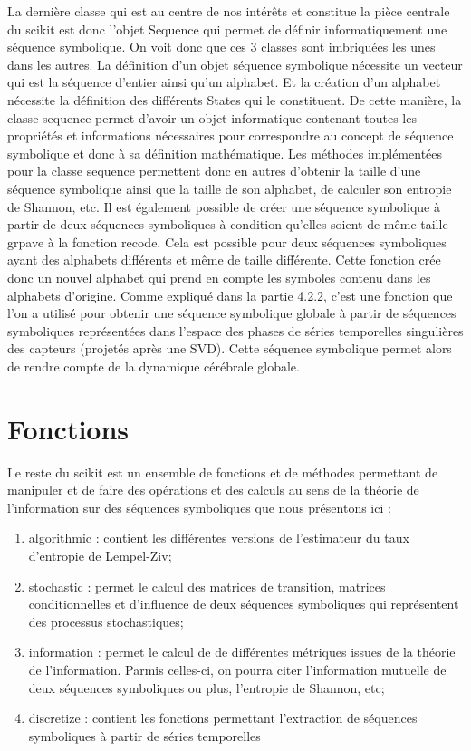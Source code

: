 \vspace{2ex}
La dernière classe qui est au centre de nos intérêts et constitue la pièce centrale du scikit est donc l’objet Sequence qui permet de définir informatiquement une séquence symbolique. On voit donc que ces 3 classes sont imbriquées les unes dans les autres. La définition d’un objet séquence symbolique nécessite un vecteur qui est la séquence d’entier ainsi qu’un alphabet. Et la création d’un alphabet nécessite la définition des différents States qui le constituent.
De cette manière, la classe sequence permet d'avoir un objet informatique contenant toutes les propriétés et informations nécessaires pour correspondre au concept de séquence symbolique et donc à sa définition mathématique. 
Les méthodes implémentées pour la classe sequence permettent donc en autres d'obtenir la taille d'une séquence symbolique ainsi que la taille de son alphabet, de calculer son entropie de Shannon, etc. Il est également possible de créer une séquence symbolique à partir de deux séquences symboliques à condition qu'elles soient de même taille grpave à la fonction recode. Cela est possible pour deux séquences symboliques ayant des alphabets différents et même de taille différente. Cette fonction crée donc un nouvel alphabet qui prend en compte les symboles contenu dans les alphabets d'origine. Comme expliqué dans la partie 4.2.2, c'est une fonction que l'on a utilisé pour obtenir une séquence symbolique globale à partir de séquences symboliques représentées dans l'espace des phases de séries temporelles singulières des capteurs (projetés après une SVD). Cette séquence symbolique permet alors de rendre compte de la dynamique cérébrale globale.

\section{Fonctions}

Le reste du scikit est un ensemble de fonctions et de méthodes permettant de manipuler et de faire des opérations et des calculs au sens de la théorie de l’information sur des séquences symboliques que nous présentons ici :

\begin{enumerate}
    \item algorithmic : contient les différentes versions de l'estimateur du taux d'entropie de Lempel-Ziv;
    \item stochastic : permet le calcul des matrices de transition, matrices conditionnelles et d'influence de deux séquences symboliques qui représentent des processus stochastiques;
    \item information : permet le calcul de de différentes métriques issues de la théorie de l'information. Parmis celles-ci, on pourra citer l'information mutuelle de deux séquences symboliques ou plus, l'entropie de Shannon, etc;
    \item discretize : contient les fonctions permettant l'extraction de séquences symboliques à partir de séries temporelles
\end{enumerate}

